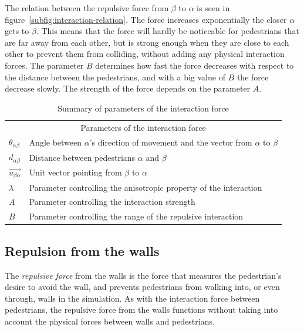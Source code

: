 The relation between the repulsive force from $\beta$ to $\alpha$ is seen in
figure~\ref{subfig:interaction-relation}. The force increases exponentially
the closer $\alpha$ gets to $\beta$. This means that the force will hardly be
noticeable for pedestrians that are far away from each other, but is strong
enough when they are close to each other to prevent them from colliding,
without adding any physical interaction forces. The parameter $B$ determines 
how fast the force decreases with respect to the distance between the 
pedestrians, and with a big value of $B$ the force decrease slowly. The 
strength of the force depends on the parameter $A$.

\begin{table}
    \centering
    \begin{tabular}{l l}
        \toprule
        \multicolumn{2}{c}{\textsf{Parameters of the interaction force}}\\
        $\theta_{\alpha \beta}$ & Angle between $\alpha$'s direction of
        movement and the vector from $\alpha$ to $\beta$\\
        $d_{\alpha \beta}$& Distance between pedestrians $\alpha$ and $\beta$ \\
        $\overrightarrow{u_{\beta \alpha}}$& Unit vector pointing from $\beta$ to $\alpha$ \\
        $\lambda$& Parameter controlling the anisotropic property of the
        interaction\\
        $A$& Parameter controlling the interaction strength \\
        $B$& Parameter controlling the range of the repulsive interaction  \\
        \bottomrule
    \end{tabular}
    \caption{Summary of parameters of the interaction force}
    \label{tbl:interaction-forces}
\end{table}

\subsection{Repulsion from the walls}
\label{sec:wall-repulsion}
The \emph{repulsive force} from the walls is the force that measures the 
pedestrian's desire to avoid the wall, and prevents
pedestrians from walking into, or even through, walls in the simulation. As
with the interaction force between pedestrians, the repulsive force from the
walls functions without taking into account the physical forces between walls
and pedestrians.

